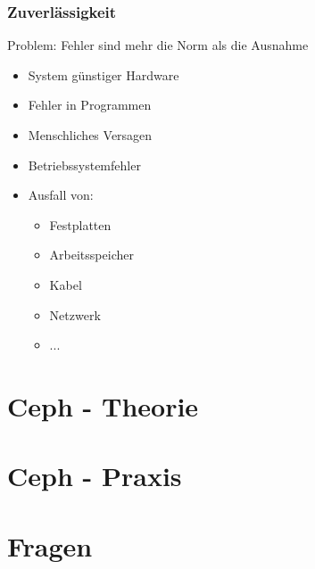 \documentclass[notes=hide,yellow]{beamer}
\begin{document}
\begin{frame}
	\frametitle{Zuverl\"assigkeit}
	Problem: Fehler sind mehr die Norm als die Ausnahme
	\begin{itemize}
		\item System g\"unstiger Hardware
		\item Fehler in Programmen %
		\item Menschliches Versagen %
		\item Betriebssystemfehler %
		\item Ausfall von: 
		\begin{itemize}
			\item Festplatten
			\item Arbeitsspeicher
			\item Kabel
			\item Netzwerk
			\item ...
		\end{itemize}
	\end{itemize}		
\end{frame}


\section{Ceph - Theorie}
\subsection*{}
\begin{frame}

\end{frame}


\section{Ceph - Praxis}
\subsection*{}
\begin{frame}

\end{frame}

\section{Fragen}
\end{document}
